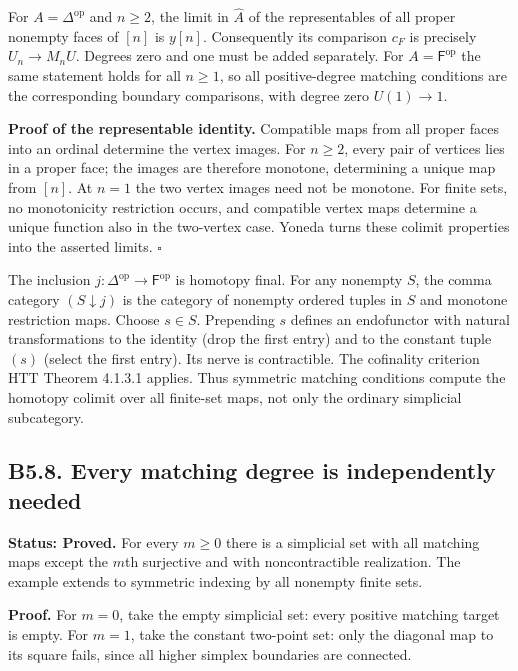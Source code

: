 For \(A=\Delta^{\mathrm{op}}\) and \(n\ge2\), the limit in
\(\widehat A\) of the representables of all proper nonempty faces of
\([n]\) is \(y[n]\). Consequently its comparison \(c_F\) is precisely
\(U_n\to M_nU\). Degrees zero and one must be added separately. For
\(A=\mathsf F^{\mathrm{op}}\) the same statement holds for all
\(n\ge1\), so all positive-degree matching conditions are the
corresponding boundary comparisons, with degree zero \(U(1)\to1\).

\textbf{Proof of the representable identity.} Compatible maps from all
proper faces into an ordinal determine the vertex images. For \(n\ge2\),
every pair of vertices lies in a proper face; the images are therefore
monotone, determining a unique map from \([n]\). At \(n=1\) the two
vertex images need not be monotone. For finite sets, no monotonicity
restriction occurs, and compatible vertex maps determine a unique
function also in the two-vertex case. Yoneda turns these colimit
properties into the asserted limits. \(\square\)

The inclusion \(j:\Delta^{\mathrm{op}}\to\mathsf F^{\mathrm{op}}\) is
homotopy final. For any nonempty \(S\), the comma category
\((S\downarrow j)\) is the category of nonempty ordered tuples in \(S\)
and monotone restriction maps. Choose \(s\in S\). Prepending \(s\)
defines an endofunctor with natural transformations to the identity
(drop the first entry) and to the constant tuple \((s)\) (select the
first entry). Its nerve is contractible. The cofinality criterion HTT
Theorem 4.1.3.1 applies. Thus symmetric matching conditions compute the
homotopy colimit over all finite-set maps, not only the ordinary
simplicial subcategory.

\subsection{B5.8. Every matching degree is independently
needed}\label{b5.8.-every-matching-degree-is-independently-needed}

\textbf{Status: Proved.} For every \(m\ge0\) there is a simplicial set
with all matching maps except the \(m\)th surjective and with
noncontractible realization. The example extends to symmetric indexing
by all nonempty finite sets.

\textbf{Proof.} For \(m=0\), take the empty simplicial set: every
positive matching target is empty. For \(m=1\), take the constant
two-point set: only the diagonal map to its square fails, since all
higher simplex boundaries are connected.

